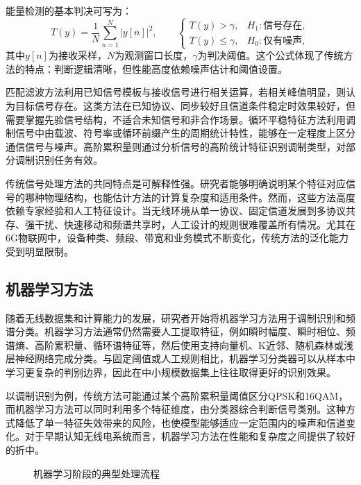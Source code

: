 \documentclass[UTF8,fontset=windows,zihao=-4]{ctexart}
\begin{document}
能量检测的基本判决可写为：
\begin{equation}
T(y)=\frac{1}{N}\sum_{n=1}^{N}|y[n]|^2,\qquad
\begin{cases}
T(y)>\gamma, & H_1:\text{信号存在},\\
T(y)\leq\gamma, & H_0:\text{仅有噪声},
\end{cases}
\end{equation}
其中$y[n]$为接收采样，$N$为观测窗口长度，$\gamma$为判决阈值。这个公式体现了传统方法的特点：判断逻辑清晰，但性能高度依赖噪声估计和阈值设置。

匹配滤波方法利用已知信号模板与接收信号进行相关运算，若相关峰值明显，则认为目标信号存在。这类方法在已知协议、同步较好且信道条件稳定时效果较好，但需要掌握先验信号结构，不适合未知信号和非合作场景。循环平稳特征方法利用调制信号中由载波、符号率或循环前缀产生的周期统计特性，能够在一定程度上区分通信信号与噪声。高阶累积量则通过分析信号的高阶统计特征识别调制类型，对部分调制识别任务有效。

传统信号处理方法的共同特点是可解释性强。研究者能够明确说明某个特征对应信号的哪种物理结构，也能估计方法的计算复杂度和适用条件。然而，这些方法高度依赖专家经验和人工特征设计。当无线环境从单一协议、固定信道发展到多协议共存、强干扰、快速移动和频谱共享时，人工设计的规则很难覆盖所有情况。尤其在6G物联网中，设备种类、频段、带宽和业务模式不断变化，传统方法的泛化能力受到明显限制。

\subsection{机器学习方法}
随着无线数据集和计算能力的发展，研究者开始将机器学习方法用于调制识别和频谱分类。机器学习方法通常仍然需要人工提取特征，例如瞬时幅度、瞬时相位、频谱熵、高阶累积量、循环谱特征等，然后使用支持向量机、K近邻、随机森林或浅层神经网络完成分类。与固定阈值或人工规则相比，机器学习分类器可以从样本中学习更复杂的判别边界，因此在中小规模数据集上往往取得更好的识别效果。

以调制识别为例，传统方法可能通过某个高阶累积量阈值区分QPSK和16QAM，而机器学习方法可以同时利用多个特征维度，由分类器综合判断信号类别。这种方式降低了单一特征失效带来的风险，也使模型能够适应一定范围内的噪声和信道变化。对于早期认知无线电系统而言，机器学习方法在性能和复杂度之间提供了较好的折中。

\begin{figure}[H]
\centering
{}
\caption{机器学习阶段的典型处理流程}
\label{fig:ml-pipeline}
\end{figure}
\end{document}

